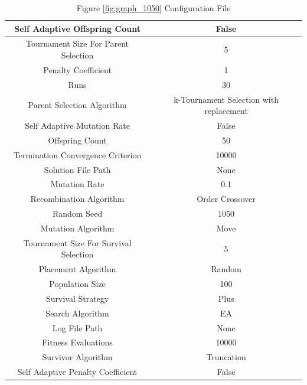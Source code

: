 \documentclass{standalone}
\begin{document}
\begin{table}[!htb]
	\centering
	\caption{Figure \ref{fig:graph_1050} Configuration File}
	\label{tab:graph_1050}
	\begin{tabular}{| c | c |}
		\hline
		Self Adaptive Offspring Count		& False		 \\
		\hline
		Tournament Size For Parent Selection		& 5		 \\
		\hline
		Penalty Coefficient		& 1		 \\
		\hline
		Runs		& 30		 \\
		\hline
		Parent Selection Algorithm		& k-Tournament Selection with replacement		 \\
		\hline
		Self Adaptive Mutation Rate		& False		 \\
		\hline
		Offspring Count		& 50		 \\
		\hline
		Termination Convergence Criterion		& 10000		 \\
		\hline
		Solution File Path		& None		 \\
		\hline
		Mutation Rate		& 0.1		 \\
		\hline
		Recombination Algorithm		& Order Crossover		 \\
		\hline
		Random Seed		& 1050		 \\
		\hline
		Mutation Algorithm		& Move		 \\
		\hline
		Tournament Size For Survival Selection		& 5		 \\
		\hline
		Placement Algorithm		& Random		 \\
		\hline
		Population Size		& 100		 \\
		\hline
		Survival Strategy		& Plus		 \\
		\hline
		Search Algorithm		& EA		 \\
		\hline
		Log File Path		& None		 \\
		\hline
		Fitness Evaluations		& 10000		 \\
		\hline
		Survivor Algorithm		& Truncation		 \\
		\hline
		Self Adaptive Penalty Coefficient		& False		 \\
		\hline
	\end{tabular}
\end{table}
\end{document}
